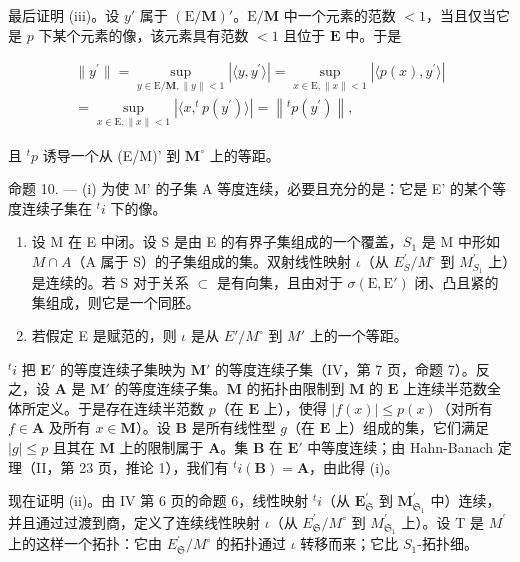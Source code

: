 最后证明 (iii)。设 \(y'\) 属于 \((\mathrm{E} / \mathbf{M})'\)。\(\mathrm{E} / \mathbf{M}\) 中一个元素的范数 \(< 1\)，当且仅当它是 \(p\) 下某个元素的像，该元素具有范数 \(< 1\) 且位于 \(\mathbf{E}\) 中。于是

\[
\begin{array}{l} \| y ^ {\prime} \| = \sup _ {y \in \mathrm{E} / \mathbf {M}, \| y \| <   1} \left| \langle y, y ^ {\prime} \rangle \right| = \sup _ {x \in \mathrm{E}, \| x \| <   1} \left| \langle p (x), y ^ {\prime} \rangle \right| \\ = \sup _ {x \in \mathrm{E}, \| x \| <   1} \left| \langle x, ^ {t} p (y ^ {\prime}) \rangle \right| = \left\| ^ {t} p (y ^ {\prime}) \right\|, \end{array}
\]

且 \({}^t p\) 诱导一个从 (E/M)' 到 \({\mathbf{M}}^{ \circ  }\) 上的等距。

命题 10. --- (i) 为使 M' 的子集 A 等度连续，必要且充分的是：它是 E' 的某个等度连续子集在 \({}^t i\) 下的像。

\begin{enumerate}
\def\labelenumi{(\roman{enumi})}
\setcounter{enumi}{1}
\item
  设 M 在 E 中闭。设 S 是由 E 的有界子集组成的一个覆盖，\(S_{1}\) 是 M 中形如 \(M \cap A\)（A 属于 S）的子集组成的集。双射线性映射 \(\iota\)（从 \(E_{S}^{\prime}/M^{\circ}\) 到 \(M_{S_{1}}^{\prime}\) 上）是连续的。若 S 对于关系 \(\subset\) 是有向集，且由对于 \(\sigma(\mathrm{E}, \mathrm{E}')\) 闭、凸且紧的集组成，则它是一个同胚。
\item
  若假定 E 是赋范的，则 \(\iota\) 是从 \(E'/M^{\circ}\) 到 \(M'\) 上的一个等距。
\end{enumerate}

\({}^t i\) 把 \(\mathbf{E}'\) 的等度连续子集映为 \(\mathbf{M}'\) 的等度连续子集（IV，第 7 页，命题 7）。反之，设 \(\mathbf{A}\) 是 \(\mathbf{M}'\) 的等度连续子集。\(\mathbf{M}\) 的拓扑由限制到 \(\mathbf{M}\) 的 \(\mathbf{E}\) 上连续半范数全体所定义。于是存在连续半范数 \(p\)（在 \(\mathbf{E}\) 上），使得 \(|f(x)| \leqslant p(x)\)（对所有 \(f \in \mathbf{A}\) 及所有 \(x \in \mathbf{M}\)）。设 \(\mathbf{B}\) 是所有线性型 \(g\)（在 \(\mathbf{E}\) 上）组成的集，它们满足 \(|g| \leqslant p\) 且其在 \(\mathbf{M}\) 上的限制属于 \(\mathbf{A}\)。集 \(\mathbf{B}\) 在 \(\mathbf{E}'\) 中等度连续；由 Hahn-Banach 定理（II，第 23 页，推论 1），我们有 \({}^t i(\mathbf{B}) = \mathbf{A}\)，由此得 (i)。

现在证明 (ii)。由 IV 第 6 页的命题 6，线性映射 \({}^t i\)（从 \(\mathbf{E}_{\mathfrak{S}}^{\prime}\) 到 \(\mathbf{M}_{\mathfrak{S}_1}^{\prime}\) 中）连续，并且通过过渡到商，定义了连续线性映射 \(\iota\)（从 \(E_{\mathfrak{S}}^{\prime}/M^{\circ}\) 到 \(M_{\mathfrak{S}_{1}}^{\prime}\) 上）。设 T 是 \(M^{\prime}\) 上的这样一个拓扑：它由 \(E_{\mathfrak{S}}^{\prime}/M^{\circ}\) 的拓扑通过 \(\iota\) 转移而来；它比 \(S_{1}\)-拓扑细。


